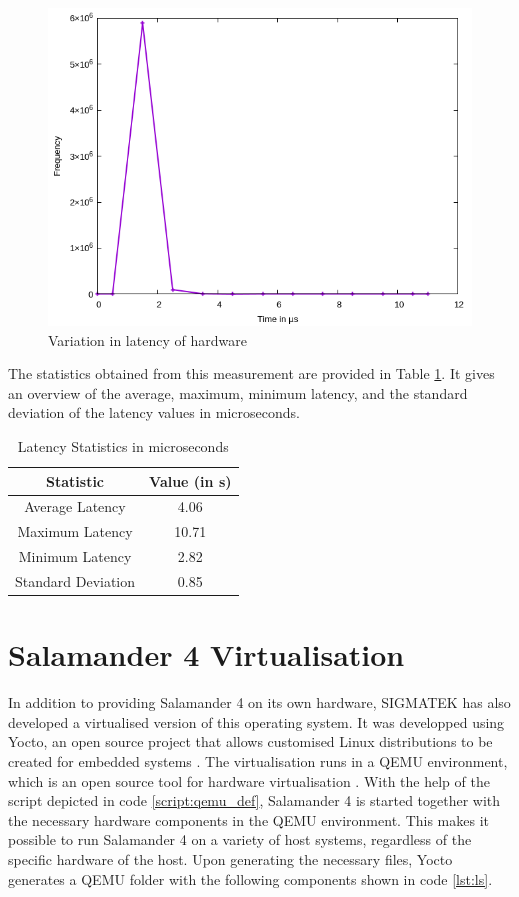 \documentclass[MMR,Master,english]{twbook}
\begin{document}
\begin{figure}[H]
	\centering
	\includegraphics[width=0.7\columnwidth]{masterthesis-documentation/docs/sigmatek/xenomai/0hardware/gnuplot_max_latency_hardware.png}
	\caption[Variation in latency of hardware]{Variation in latency of hardware}
	\label{fig:gnuplot_max_latency_hardware}
\end{figure}

\clearpage

\noindent The statistics obtained from this measurement are provided in Table \ref{tab:latency_statistics}. It gives an overview of the average, maximum, minimum latency, and the standard deviation of the latency values in microseconds. 

\begin{table}[h]
	\centering
	\caption{Latency Statistics in microseconds}
	\label{tab:latency_statistics}
	\begin{tabular}{|c|c|}\hline
	\textbf{Statistic} & \textbf{Value (in \textmu s)} \\\hline
	Average Latency & 4.06 \\\hline
	Maximum Latency & 10.71 \\\hline
	Minimum Latency & 2.82 \\\hline
	Standard Deviation & 0.85 \\\hline
	\end{tabular}
	\end{table}

\section{Salamander 4 Virtualisation}\label{sec:salamander4-virtualisation}
In addition to providing Salamander 4 on its own hardware, SIGMATEK has also developed a virtualised version of this operating system. It was developped using Yocto, an open source project that allows customised Linux distributions to be created for embedded systems \cite{WelcomeYoctoProject}. The virtualisation runs in a QEMU environment, which is an open source tool for hardware virtualisation \cite{QEMU}. With the help of the script depicted in code \ref{script:qemu_def}, Salamander 4 is started together with the necessary hardware components in the QEMU environment. This makes it possible to run Salamander 4 on a variety of host systems, regardless of the specific hardware of the host. Upon generating the necessary files, Yocto generates a QEMU folder with the following components shown in code \ref{lst:ls}.
\end{document}
